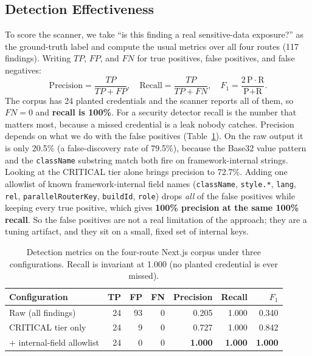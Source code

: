 \documentclass[runningheads]{llncs}
\begin{document}
\subsection{Detection Effectiveness}
\label{sec:metrics}

To score the scanner, we take ``is this finding a real sensitive-data
exposure?'' as the ground-truth label and compute the usual metrics over
all four routes (117 findings).  Writing $\mathit{TP}$, $\mathit{FP}$, and
$\mathit{FN}$ for true positives, false positives, and false negatives:
\[
\text{Precision}=\frac{\mathit{TP}}{\mathit{TP}+\mathit{FP}},\quad
\text{Recall}=\frac{\mathit{TP}}{\mathit{TP}+\mathit{FN}},\quad
F_1=\frac{2\,\text{P}\cdot\text{R}}{\text{P}+\text{R}}.
\]
The corpus has 24 planted credentials and the scanner reports all of
them, so $\mathit{FN}=0$ and \textbf{recall is 100\%}.  For a security
detector recall is the number that matters most, because a missed
credential is a leak nobody catches.  Precision depends on what we do with
the false positives (Table~\ref{tab:metrics}).  On the raw output it is
only 20.5\% (a false-discovery rate of 79.5\%), because the Base32 value
pattern and the \texttt{className} substring match both fire on
framework-internal strings.  Looking at the CRITICAL tier alone brings
precision to 72.7\%.  Adding one allowlist of known framework-internal
field names (\texttt{className}, \texttt{style.*}, \texttt{lang},
\texttt{rel}, \texttt{parallelRouterKey}, \texttt{buildId}, \texttt{role})
drops \emph{all} of the false positives while keeping every true positive,
which gives \textbf{100\% precision at the same 100\% recall}.  So the
false positives are not a real limitation of the approach; they are a
tuning artifact, and they sit on a small, fixed set of internal keys.

\begin{table}[tbp]
  \caption{Detection metrics on the four-route Next.js corpus under three
    configurations.  Recall is invariant at 1.000 (no planted credential is
    ever missed).}
  \label{tab:metrics}
  \centering
  \begin{tabular}{lrrrrrr}
    \toprule
    \textbf{Configuration} & \textbf{TP} & \textbf{FP} & \textbf{FN}
      & \textbf{Precision} & \textbf{Recall} & \textbf{$F_1$} \\
    \midrule
    Raw (all findings)          & 24 & 93 & 0 & 0.205 & 1.000 & 0.340 \\
    CRITICAL tier only          & 24 &  9 & 0 & 0.727 & 1.000 & 0.842 \\
    + internal-field allowlist  & 24 &  0 & 0 & \textbf{1.000} & \textbf{1.000} & \textbf{1.000} \\
    \bottomrule
  \end{tabular}
\end{table}
\end{document}
